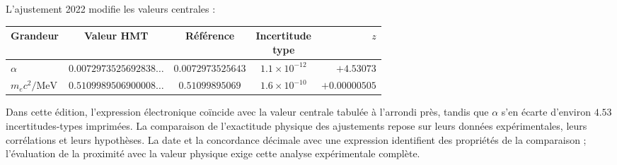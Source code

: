 L'ajustement 2022 modifie les valeurs centrales\cite{codata2022} :
\begin{center}
\begin{tabular}{@{}lcccr@{}}\toprule
Grandeur&Valeur HMT&Référence&\shortstack{Incertitude\\type}&\(z\)\\\midrule
\(\alpha\)&\(0.0072973525692838\ldots\)&\(0.0072973525643\)&\(1.1\times10^{-12}\)&\(+4.53073\)\\
\(m_ec^2/\mathrm{MeV}\)&\(0.5109989506900008\ldots\)&\(0.51099895069\)&\(1.6\times10^{-10}\)&\(+0.00000505\)\\\bottomrule
\end{tabular}
\end{center}
Dans cette édition, l'expression électronique coïncide avec la valeur centrale tabulée à l'arrondi près, tandis que \(\alpha\) s'en écarte d'environ \(4.53\) incertitudes-types imprimées. La comparaison de l'exactitude physique des ajustements repose sur leurs données expérimentales, leurs corrélations et leurs hypothèses. La date et la concordance décimale avec une expression identifient des propriétés de la comparaison ; l'évaluation de la proximité avec la valeur physique exige cette analyse expérimentale complète.


